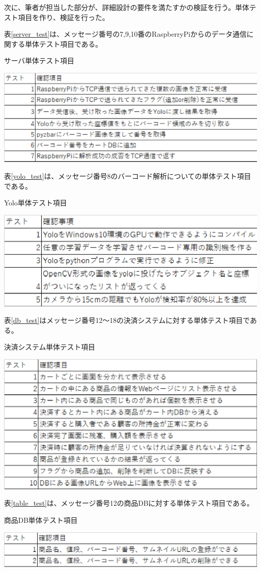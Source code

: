\newpage

次に、筆者が担当した部分が、詳細設計の要件を満たすかの検証を行う。単体テスト項目を作り、検証を行った。

表\ref{server_test}は、メッセージ番号の7,9,10番のRaspberryPiからのデータ通信に関する単体テスト項目である。
\begin{table}[htbp]
\centering
\caption{サーバ単体テスト項目}
\includegraphics[width=15cm]{./pic/server_test.eps}
\label{server_test}
\end{table}

表\ref{yolo_test}は、メッセージ番号8のバーコード解析についての単体テスト項目である。
\begin{table}[htbp]
\centering
\caption{Yolo単体テスト項目}
\includegraphics[width=15cm]{./pic/yolo_test.eps}
\label{yolo_test}
\end{table}

\newpage

表\ref{db_test}はメッセージ番号12～18の決済システムに対する単体テスト項目である。
\begin{table}[htbp]
\centering
\caption{決済システム単体テスト項目}
\includegraphics[width=15cm]{./pic/db_test.eps}
\label{db_test}
\end{table}

表\ref{table_test}は、メッセージ番号12の商品DBに対する単体テスト項目である。
\begin{table}[htbp]
\centering
\caption{商品DB単体テスト項目}
\includegraphics[width=15cm]{./pic/table_test.eps}
\label{table_test}
\end{table}
